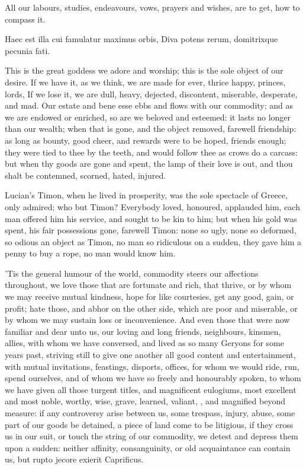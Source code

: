 {All our labours, studies, endeavours, vows, prayers and wishes, are to
get, how to compass it.

Haec est illa cui famulatur maximus orbis,
Diva potens rerum, domitrixque pecunia fati.

This is the great goddess we adore and worship; this is the sole object
of our desire. If we have it, as we think, we are made for ever, thrice
happy, princes, lords, \etc{} If we lose it, we are dull, heavy, dejected,
discontent, miserable, desperate, and mad. Our estate and bene esse
ebbs and flows with our commodity; and as we are endowed or enriched,
so are we beloved and esteemed: it lasts no longer than our wealth;
when that is gone, and the object removed, farewell friendship: as long
as bounty, good cheer, and rewards were to be hoped, friends enough;
they were tied to thee by the teeth, and would follow thee as crows do
a carcass: but when thy goods are gone and spent, the lamp of their
love is out, and thou shalt be contemned, scorned, hated, injured.

Lucian's Timon, when he lived in prosperity, was the sole
spectacle of Greece, only admired; who but Timon? Everybody loved,
honoured, applauded him, each man offered him his service, and sought
to be kin to him; but when his gold was spent, his fair possessions
gone, farewell Timon: none so ugly, none so deformed, so odious an
object as Timon, no man so ridiculous on a sudden, they gave him a
penny to buy a rope, no man would know him.

'Tis the general humour of the world, commodity steers our affections
throughout, we love those that are fortunate and rich, that thrive, or
by whom we may receive mutual kindness, hope for like courtesies, get
any good, gain, or profit; hate those, and abhor on the other side,
which are poor and miserable, or by whom we may sustain loss or
inconvenience. And even those that were now familiar and dear unto us,
our loving and long friends, neighbours, kinsmen, allies, with whom we
have conversed, and lived as so many Geryons for some years past,
striving still to give one another all good content and entertainment,
with mutual invitations, feastings, disports, offices, for whom we
would ride, run, spend ourselves, and of whom we have so freely and
honourably spoken, to whom we have given all those turgent titles, and
magnificent eulogiums, most excellent and most noble, worthy, wise,
grave, learned, valiant, \etc{}, and magnified beyond measure: if any
controversy arise between us, some trespass, injury, abuse, some part
of our goods be detained, a piece of land come to be litigious, if they
cross us in our suit, or touch the string of our commodity, we detest
and depress them upon a sudden: neither affinity, consanguinity, or old
acquaintance can contain us, but rupto jecore exierit Caprificus.

}
